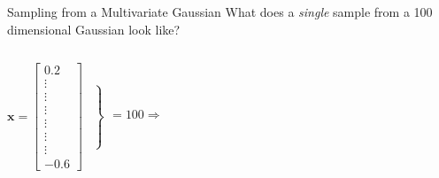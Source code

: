 \documentclass[pdf]{beamer}
\begin{document}
\begin{frame}{Sampling from a Multivariate Gaussian}
What does a \textit{single} sample from a 100 dimensional Gaussian look like?
\vspace{1cm}
\begin{columns}
	$\mathbf{x}=
	\left[
	\begin{array}{c}
	0.2 \\ \vdots \\ \vdots \\ \vdots \\ \vdots \\ \vdots \\ \vdots \\ -0.6
	\end{array}
	\right]
	\left.
	\begin{array}{c}
	 \\  \\  \\  \\  \\  \\  \\ \\  \\ \\ \\ %
	\end{array}
	\right\}
	\begin{array}{c}
	 \\  \\  \\  \\ \\ =100 \Longrightarrow \\  \\ \\  \\ \\ \\ %
	\end{array}
	$
\begin{center}

\end{center}
\end{columns}
\end{frame}
\end{document}
